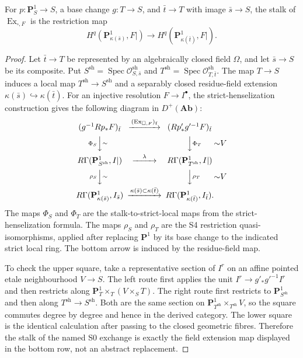 \begin{lemma}
\label{lemma:weil-pbc-p1-exchange-geometric-stalk}
For $p:\mathbf P^1_S\to S$, a base change $g:T\to S$, and
$\bar t\to T$ with image $\bar s\to S$, the stalk of
$\operatorname{Ex}_{\square,F}$ is the restriction map
\[
 H^q(\mathbf P^1_{\kappa(\bar s)},F|)
 \longrightarrow H^q(\mathbf P^1_{\kappa(\bar t)},F|).
\]
\end{lemma}
\begin{proof}

Let $\bar t\to T$ be represented by an algebraically closed field $\Omega$,
and let $\bar s\to S$ be its composite.  Put
$S^{\mathrm{sh}}=\operatorname{Spec}\mathcal O^{\mathrm{sh}}_{S,\bar s}$ and
$T^{\mathrm{sh}}=\operatorname{Spec}\mathcal O^{\mathrm{sh}}_{T,\bar t}$.
The map $T\to S$ induces a local map $T^{\mathrm{sh}}\to S^{\mathrm{sh}}$
and a separably closed residue-field extension
$\kappa(\bar s)\hookrightarrow\kappa(\bar t)$.  For an injective
resolution $F\to I^\bullet$, the strict-henselization construction gives
the following diagram in $D^+(\mathbf{Ab})$:
\[
\begin{CD}
 (g^{-1}Rp_*F)_{\bar t}
   @>{(\operatorname{Ex}_{\square,F})_{\bar t}}>>
 (Rp'_*g'^{-1}F)_{\bar t}\\
 @V{\Phi_S}V{\sim}V @VV{\Phi_T}V{\sim}V\\
 R\Gamma(\mathbf P^1_{S^{\mathrm{sh}}},I|)
   @>{\lambda}>>
 R\Gamma(\mathbf P^1_{T^{\mathrm{sh}}},I|)\\
 @V{\rho_S}V{\sim}V @VV{\rho_T}V{\sim}V\\
 R\Gamma(\mathbf P^1_{\kappa(\bar s)},I_{\bar s})
   @>{\kappa(\bar s)\subset\kappa(\bar t)}>>
 R\Gamma(\mathbf P^1_{\kappa(\bar t)},I_{\bar t}).
\end{CD}
\]
The maps $\Phi_S$ and $\Phi_T$ are the stalk-to-strict-local maps from the
strict-henselization formula.  The maps $\rho_S$ and $\rho_T$ are the S4
restriction quasi-isomorphisms, applied after replacing $\mathbf P^1$ by its
base change to the indicated strict local ring.  The bottom arrow is induced
by the residue-field map.

To check the upper square, take a representative section of $I^r$ on an
affine pointed etale neighbourhood $V\to S$.  The left route first applies
the unit $I^r\to g'_*g'^{-1}I^r$ and then restricts along
$\mathbf P^1_T\times_T(V\times_ST)$.  The right route first restricts to
$\mathbf P^1_{S^{\mathrm{sh}}}$ and then along $T^{\mathrm{sh}}\to
S^{\mathrm{sh}}$.  Both are the same section on
$\mathbf P^1_{T^{\mathrm{sh}}}\times_{T^{\mathrm{sh}}}V$, so the square
commutes degree by degree and hence in the derived category.  The lower
square is the identical calculation after passing to the closed geometric
fibres.  Therefore the stalk of the named S0 exchange is exactly the field
extension map displayed in the bottom row, not an abstract replacement.
\end{proof}

